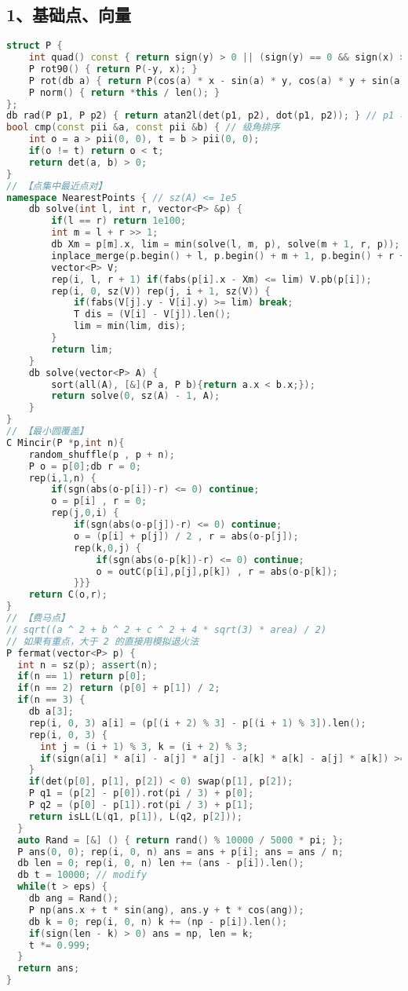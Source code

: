 \subsection{1、基础点、向量}
\begin{lstlisting}[language=C++]
struct P {
	int quad() const { return sign(y) > 0 || (sign(y) == 0 && sign(x) >= 0); }
	P rot90() { return P(-y, x); }
	P rot(db a) { return P(cos(a) * x - sin(a) * y, cos(a) * y + sin(a) * x); }
	P norm() { return *this / len(); }
};
db rad(P p1, P p2) { return atan2l(det(p1, p2), dot(p1, p2)); } // p1 与 p2 的夹角，有方向
bool cmp(const pii &a, const pii &b) { // 级角排序
	int o = a > pii(0, 0), t = b > pii(0, 0);
	if(o != t) return o < t;
	return det(a, b) > 0;
}
// 【点集中最近点对】
namespace NearestPoints { // sz(A) <= 1e5
	db solve(int l, int r, vector<P> &p) {
		if(l == r) return 1e100;
		int m = l + r >> 1;
		db Xm = p[m].x, lim = min(solve(l, m, p), solve(m + 1, r, p));
		inplace_merge(p.begin() + l, p.begin() + m + 1, p.begin() + r + 1, [&](P a, P b){return a.y < b.y;});
		vector<P> V;
		rep(i, l, r + 1) if(fabs(p[i].x - Xm) <= lim) V.pb(p[i]);
		rep(i, 0, sz(V)) rep(j, i + 1, sz(V)) {
			if(fabs(V[j].y - V[i].y) >= lim) break;
			T dis = (V[i] - V[j]).len();
			lim = min(lim, dis);
		}
		return lim;
	}
	db solve(vector<P> A) {
		sort(all(A), [&](P a, P b){return a.x < b.x;});
		return solve(0, sz(A) - 1, A);
	}
}
// 【最小圆覆盖】
C Mincir(P *p,int n){ 
	random_shuffle(p , p + n);
	P o = p[0];db r = 0;
	rep(i,1,n) {
		if(sgn(abs(o-p[i])-r) <= 0) continue;
		o = p[i] , r = 0;
		rep(j,0,i) {
			if(sgn(abs(o-p[j])-r) <= 0) continue;
			o = (p[i] + p[j]) / 2 , r = abs(o-p[j]);
			rep(k,0,j) {
				if(sgn(abs(o-p[k])-r) <= 0) continue;
				o = outC(p[i],p[j],p[k]) , r = abs(o-p[k]);
			}}}
	return C(o,r);
}
// 【费马点】
// sqrt((a ^ 2 + b ^ 2 + c ^ 2 + 4 * sqrt(3) * area) / 2)
// 如果有重点，大于 2 的直接用模拟退火法
P fermat(vector<P> p) {
  int n = sz(p); assert(n);
  if(n == 1) return p[0];
  if(n == 2) return (p[0] + p[1]) / 2;
  if(n == 3) {
    db a[3];
    rep(i, 0, 3) a[i] = (p[(i + 2) % 3] - p[(i + 1) % 3]).len();
    rep(i, 0, 3) {
      int j = (i + 1) % 3, k = (i + 2) % 3;
      if(sign(a[i] * a[i] - a[j] * a[j] - a[k] * a[k] - a[j] * a[k]) >= 0) return p[i];
    }
    if(det(p[0], p[1], p[2]) < 0) swap(p[1], p[2]);
    P q1 = (p[2] - p[0]).rot(pi / 3) + p[0]; 
    P q2 = (p[0] - p[1]).rot(pi / 3) + p[1];
    return isLL(L(q1, p[1]), L(q2, p[2]));
  }
  auto Rand = [&] () { return rand() % 10000 / 5000 * pi; };
  P ans(0, 0); rep(i, 0, n) ans = ans + p[i]; ans = ans / n;
  db len = 0; rep(i, 0, n) len += (ans - p[i]).len();
  db t = 10000; // modify
  while(t > eps) {
    db ang = Rand();
    P np(ans.x + t * sin(ang), ans.y + t * cos(ang));
    db k = 0; rep(i, 0, n) k += (np - p[i]).len();
    if(sign(len - k) > 0) ans = np, len = k;
    t *= 0.999;
  }
  return ans;
}
\end{lstlisting}
